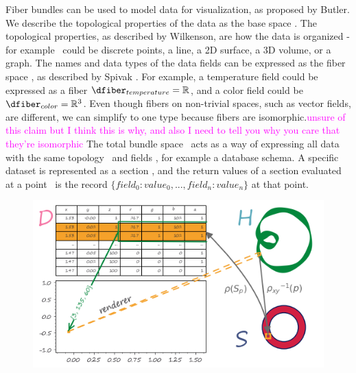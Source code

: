 \documentclass[10pt,journal,compsoc]{IEEEtran}
\newcommand{\note}[1]{\textcolor{magenta}{#1}}
\theoremstyle{definition}
\theoremstyle{remark}
\begin{document}
Fiber bundles can be used to model data for visualization, as proposed by Butler\cite{butlerVectorBundleClassesForm1992, butlerVisualizationModelBased1989}. We describe the topological properties of the data \cite{wilkinsonGrammarGraphics2005} as the base space \dbasec. The topological properties, as described by Wilkenson, are how the data is organized - for example \dbase\ could be discrete points, a line, a 2D surface, a 3D volume, or a graph. The names and data types of the data fields can be expressed as the fiber space \dfiberc, as described by Spivak \cite{spivakDatabasesAreCategories2010,spivakSIMPLICIALDATABASES}. For example, a temperature field could be expressed as a fiber $\dfiber_{temperature}=\mathbb{R}$, and a color field could be $\dfiber_{color}=\mathbb{R}^{3}$. Even though fibers on non-trivial spaces, such as vector fields, are different, we can simplify to one type because fibers are isomorphic.\note{unsure of this claim but I think this is why, and also I need to tell you why you care that they're isomorphic} The total bundle space \dtotalc\ acts as a way of expressing all data with the same topology \dbasec\ and fields \dfiberc, for example a database schema. A specific dataset is represented as a section \dsectionc, and the return values of a section evaluated at a point \dbasepointc\ is the record $\{field_{0}: value_{0}, ..., field_n:value_n\}$ at that point. 

\begin{figure}
  \label{fig:atct:fb_graphic_bundle}
  \includegraphics[width=1\columnwidth]{render.png}
  \caption{}
\end{figure}
\end{document}

